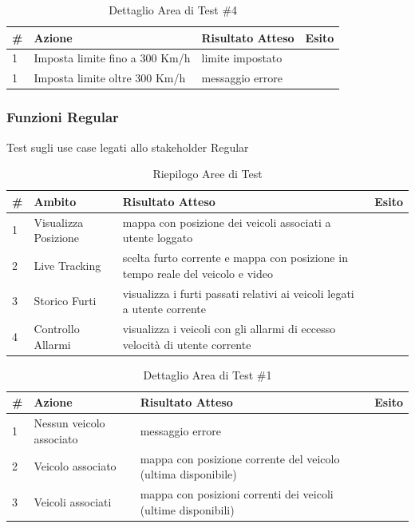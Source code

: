 \documentclass[a4paper,12pt]{article}
\begin{document}
\begin{table}[H]
\begin{center}
\caption{Dettaglio Area di Test \#4}
\begin{tabular}{p{0.5cm} p{8cm} p{3.5cm} p{1cm}}
\rowcolor{Ash}
\hline
\# & Azione & Risultato Atteso & Esito \\ \hline
1 & Imposta limite fino a 300 Km/h	&	limite impostato		&	\cellcolor{green}{OK}\\
1 & Imposta limite oltre 300 Km/h	&		messaggio errore	&		\cellcolor{green}{OK}\\ \hline
\end{tabular}
\end{center}
\end{table}

\pagebreak

\subsubsection{Funzioni Regular}

Test sugli use case legati allo stakeholder Regular

\begin{table}[h]
\begin{center}
\caption{Riepilogo Aree di Test}
\begin{tabular}{p{0.5cm} p{3.8cm} p{7.7cm} p{1cm}}
\rowcolor{Ash}
\hline
\# & Ambito & Risultato Atteso & Esito \\ \hline
1 & Visualizza Posizione	& mappa con posizione dei veicoli associati a utente loggato			& \cellcolor{green}{OK}\\
2 & Live Tracking		& scelta furto corrente e mappa con posizione in tempo reale del veicolo e video & \cellcolor{green}{OK}\\
3 & Storico Furti		& visualizza i furti passati relativi ai veicoli legati a utente corrente		& \cellcolor{green}{OK}\\
4 & Controllo Allarmi	 &	visualizza i veicoli con gli allarmi di eccesso velocità  di utente corrente		& \cellcolor{green}{OK}\\
\hline
\end{tabular}
\end{center}
\end{table}

\begin{table}[h]
\begin{center}
\caption{Dettaglio Area di Test \#1}
\begin{tabular}{p{0.5cm} p{4.5cm} p{7cm} p{1cm}}
\rowcolor{Ash}
\hline
\# & Azione & Risultato Atteso & Esito \\ \hline
1 & Nessun veicolo associato	&	messaggio errore									&	\cellcolor{green}{OK}\\
2 & Veicolo associato	&		mappa con posizione corrente del veicolo (ultima disponibile)  &	\cellcolor{green}{OK}\\
3 & Veicoli associati		&		mappa con posizioni correnti dei veicoli (ultime disponibili)       &	\cellcolor{green}{OK}\\ \hline
\end{tabular}
\end{center}
\end{table}
\end{document}

